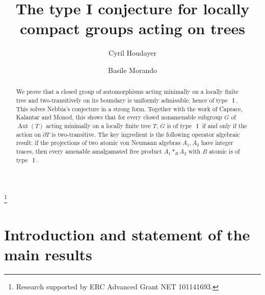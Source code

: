 \documentclass[11pt]{amsart}
\numberwithin{equation}{section}
\DeclareMathOperator{\I}{I}
\DeclareMathOperator{\Aut}{Aut}
\theoremstyle{definition}
\begin{document}
\title[The type \textup{I} conjecture for groups acting on trees]{The type \textup{I} conjecture for locally compact groups acting on trees}
\author{Cyril Houdayer}
\author{Basile Morando}

\address{\'Ecole normale sup\'erieure \\ D\'epartement de math\'ematiques et applications \\ Universit\'e Paris-Saclay \\ 45 rue d'Ulm \\ 75230 Paris Cedex 05 \\ France}

\address{\'Ecole normale sup\'erieure \\ D\'epartement de math\'ematiques et applications \\ 45 rue d'Ulm \\ 75230 Paris Cedex 05 \\ France}

\thanks{Research supported by ERC Advanced Grant NET 101141693.}


\begin{abstract}
    We prove that a closed group of automorphisms acting minimally on a locally finite tree and two-transitively on its boundary is uniformly admissible, hence of type~$\I$. This solves Nebbia's conjecture in a strong form. Together with the work of Caprace, Kalantar and Monod, this shows that for every closed nonamenable subgroup $G$ of $\Aut(T)$ acting minimally on a locally finite tree $T$, $G$ is of type~$\I$ if and only if the action on $\partial T$ is two-transitive. The key ingredient is the following operator algebraic result: if the projections of two atomic von Neumann algebras $A_1,A_2$ have integer traces, then every amenable amalgamated free product $A_1\ast_BA_2$ with $B$ atomic is of type~$\I$.
\end{abstract}

\maketitle
\vspace{2\baselineskip}
\raggedbottom



\section{Introduction and statement of the main results}
\label{sec:introduction}
\end{document}
